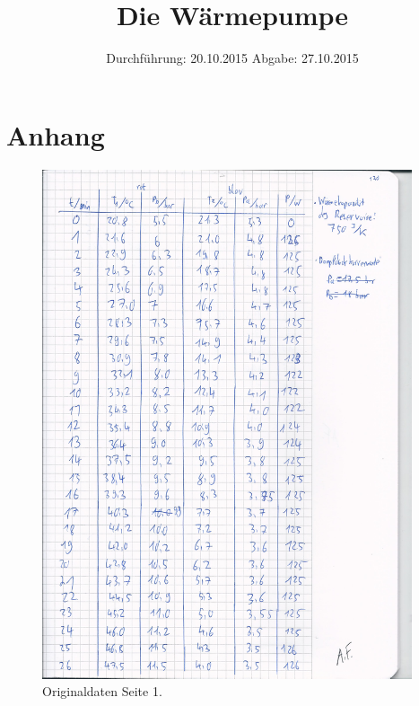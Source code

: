 

\subject{Versuchsprotokoll zum Versuch Nr. 206}
\title{Die Wärmepumpe}
\date{
  Durchführung: 20.10.2015
  \hspace{3em}
  Abgabe: 27.10.2015
}



\maketitle
\thispagestyle{empty}
\tableofcontents
\newpage





\newpage
\section{Anhang}
\begin{figure}
  \centering
  \includegraphics[height=15.0cm]{original_v206_1.jpg}
  \caption{Originaldaten Seite 1.}
  \label{fig:o1}
\end{figure}

